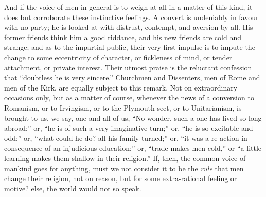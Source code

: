 And if the voice of men in general is to weigh at all in a matter
of this kind, it does but corroborate these instinctive feelings. A
convert is undeniably in favour with no party; he is looked at
with distrust, contempt, and aversion by all. His former friends think
him a good riddance, and his new friends are cold and strange; and as
to the impartial public, their very first impulse is to impute the
change to some eccentricity of character, or fickleness of mind, or
tender attachment, or private interest. Their utmost praise is the
reluctant confession that ``doubtless he is very sincere.''
Churchmen and Dissenters, men of Rome and men of the Kirk, are equally
subject to this remark. Not on extraordinary occasions only, but as a
matter of course, whenever the news of a conversion to Romanism, or to
Irvingism, or to the Plymouth sect, or to Unitarianism, is brought to
us, we say, one and all of us, ``No wonder, such a one has lived
so long abroad;'' or, ``he is of such a very imaginative
turn;'' or, ``he is so excitable and odd;'' or, ``what
could he do? all his family turned;'' or, ``it was a re-action
in consequence of an injudicious education;'' or, ``trade
makes men cold,'' or ``a little learning makes them shallow in
their religion.'' If, then, the common voice of mankind goes for
anything, must we not consider it to be the \emph{rule} that men
change their religion, not on reason, but for some extra-rational
feeling or motive? else, the world would not so speak.

